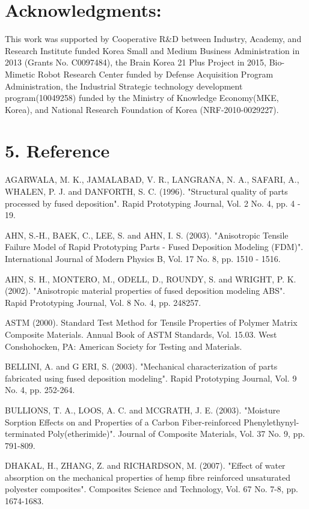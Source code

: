 \documentclass[10pt]{article}
\begin{document}
\section*{Acknowledgments:}
This work was supported by Cooperative R\&D between Industry, Academy, and Research Institute funded Korea Small and Medium Business Administration in 2013 (Grants No. C0097484), the Brain Korea 21 Plus Project in 2015, Bio-Mimetic Robot Research Center funded by Defense Acquisition Program Administration, the Industrial Strategic technology development program(10049258) funded by the Ministry of Knowledge Economy(MKE, Korea), and National Research Foundation of Korea (NRF-2010-0029227).

\section*{5. Reference}
AGARWALA, M. K., JAMALABAD, V. R., LANGRANA, N. A., SAFARI, A., WHALEN, P. J. and DANFORTH, S. C. (1996). "Structural quality of parts processed by fused deposition". Rapid Prototyping Journal, Vol. 2 No. 4, pp. 4 - 19.

AHN, S.-H., BAEK, C., LEE, S. and AHN, I. S. (2003). "Anisotropic Tensile Failure Model of Rapid Prototyping Parts - Fused Deposition Modeling (FDM)". International Journal of Modern Physics B, Vol. 17 No. 8, pp. 1510 - 1516.

AHN, S. H., MONTERO, M., ODELL, D., ROUNDY, S. and WRIGHT, P. K. (2002). "Anisotropic material properties of fused deposition modeling ABS". Rapid Prototyping Journal, Vol. 8 No. 4, pp. 248257.

ASTM (2000). Standard Test Method for Tensile Properties of Polymer Matrix Composite Materials. Annual Book of ASTM Standards, Vol. 15.03. West Conshohocken, PA: American Society for Testing and Materials.

BELLINI, A. and G ERI, S. (2003). "Mechanical characterization of parts fabricated using fused deposition modeling". Rapid Prototyping Journal, Vol. 9 No. 4, pp. 252-264.

BULLIONS, T. A., LOOS, A. C. and MCGRATH, J. E. (2003). "Moisture Sorption Effects on and Properties of a Carbon Fiber-reinforced Phenylethynyl-terminated Poly(etherimide)". Journal of Composite Materials, Vol. 37 No. 9, pp. 791-809.

DHAKAL, H., ZHANG, Z. and RICHARDSON, M. (2007). "Effect of water absorption on the mechanical properties of hemp fibre reinforced unsaturated polyester composites". Composites Science and Technology, Vol. 67 No. 7-8, pp. 1674-1683.
\end{document}
